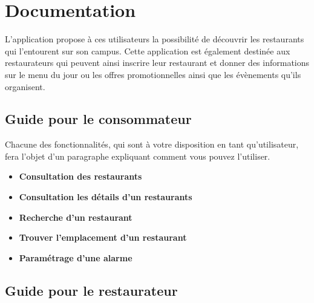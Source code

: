 \section{Documentation}

L'application \appname propose à ces utilisateurs la possibilité de découvrir les restaurants qui l'entourent sur son campus. Cette application est également destinée aux restaurateurs qui peuvent ainsi inscrire leur restaurant et donner des informations sur le menu du jour ou les offres promotionnelles ainsi que les évènements qu'ils organisent.

\subsection{Guide pour le consommateur}

Chacune des fonctionnalités, qui sont à votre disposition en tant qu'utilisateur, fera l'objet d'un paragraphe expliquant comment vous pouvez l'utiliser.


\begin{itemize}
    \item[] \bf{Consultation des restaurants}
    \item[] \bf{Consultation les détails d'un restaurants}
    \item[] \bf{Recherche d'un restaurant}
    \item[] \bf{Trouver l'emplacement d'un restaurant}
    \item[] \bf{Paramétrage d'une alarme}
\end{itemize}

\subsection{Guide pour le restaurateur}

